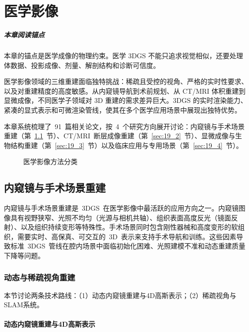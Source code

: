 \chapter{医学影像}
\label{ch:19}

\paragraph*{本章阅读锚点}
本章的锚点是医学成像的物理约束。医学 3DGS 不能只追求视觉相似，还要处理体数据、投影成像、剂量、解剖结构和诊断可信度。


医学影像领域的三维重建面临独特挑战：稀疏且受控的视角、严格的实时性要求、以及对重建精度的高度敏感。从内窥镜导航到术前规划、从 CT/MRI 体积重建到显微成像，不同医学子领域对 3D 重建的需求差异巨大。3DGS 的实时渲染能力、紧凑的显式表示和可微渲染管线，使其在多个医学应用场景中展现出独特优势。

本章系统梳理了~91~篇相关论文，按~4~个研究方向展开讨论：内窥镜与手术场景重建（第~\ref{sec:19_1}~节）、CT/MRI~断层成像重建（第~\ref{sec:19_2}~节）、显微成像与生物结构重建（第~\ref{sec:19_3}~节）以及临床应用与专用场景（第~\ref{sec:19_4}~节）。

\begin{figure}[htbp]
\centering
\resizebox{\textwidth}{!}{}
\caption{医学影像方法分类}
\label{fig:ch19_medical_taxonomy}
\end{figure}

\section{内窥镜与手术场景重建}
\label{sec:19_1}

内窥镜与手术场景重建是~3DGS~在医学影像中最活跃的应用方向之一。内窥镜图像具有视野狭窄、光照不均匀（光源与相机共轴）、组织表面高度反光（镜面反射）、以及组织持续变形等特殊性。手术场景同时包含刚性器械和高度变形的软组织，需要实时、高保真、可交互的~3D~表示来支持手术导航和训练。这些因素导致标准~3DGS~管线在腔内场景中面临初始化困难、光照建模不准和动态重建质量下降等问题。

\subsection{动态与稀疏视角重建}
\label{ss:19_1}

本节讨论两条技术路线：（1）动态内窥镜重建与4D高斯表示；（2）稀疏视角与SLAM系统。

\subsubsection{动态内窥镜重建与4D高斯表示}

